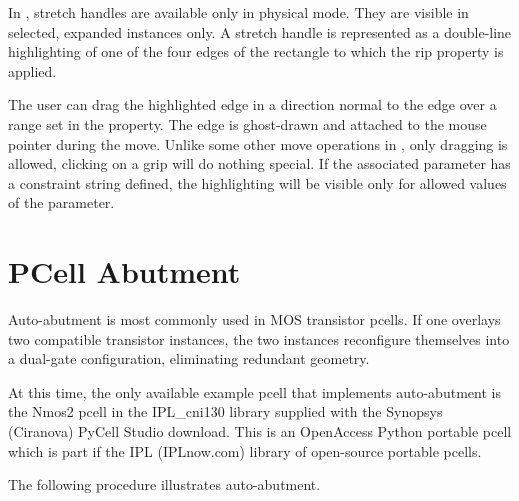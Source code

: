 In {\Xic}, stretch handles are available only in physical mode.  They
are visible in selected, expanded instances only.  A stretch handle is
represented as a double-line highlighting of one of the four edges of
the rectangle to which the {\et rip} property is applied.

The user can drag the highlighted edge in a direction normal to the
edge over a range set in the property.  The edge is ghost-drawn and
attached to the mouse pointer during the move.  Unlike some other move
operations in {\Xic}, only dragging is allowed, clicking on a grip
will do nothing special.  If the associated parameter has a constraint
string defined, the highlighting will be visible only for allowed
values of the parameter.



\section{PCell Abutment}
\label{pcabut}
Auto-abutment is most commonly used in MOS transistor pcells.  If one
overlays two compatible transistor instances, the two instances
reconfigure themselves into a dual-gate configuration, eliminating
redundant geometry.

At this time, the only available example pcell that implements
auto-abutment is the Nmos2 pcell in the IPL\_cni130 library supplied
with the Synopsys (Ciranova) PyCell Studio download.  This is an
OpenAccess Python portable pcell which is part if the IPL (IPLnow.com)
library of open-source portable pcells.

\ifoa
The following procedure illustrates auto-abutment.

